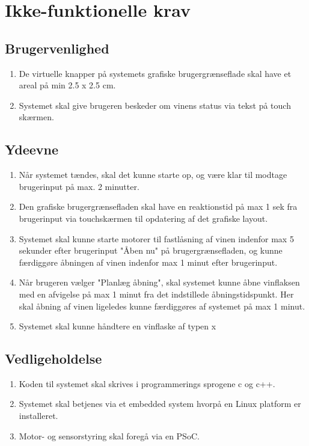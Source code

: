 \section{Ikke-funktionelle krav}

\subsection{Brugervenlighed}

\begin{enumerate}
\item De virtuelle knapper på systemets grafiske brugergrænseflade skal have et areal på min 2.5 x 2.5 cm.
\item Systemet skal give brugeren beskeder om vinens status via tekst på touch skærmen.
\end{enumerate}

\subsection{Ydeevne}
\begin{enumerate}
\item Når systemet tændes, skal det kunne starte op, og være klar til modtage brugerinput på max. 2 minutter.
\item Den grafiske brugergrænsefladen skal have en reaktionstid på max 1 sek fra brugerinput via touchskærmen 
til opdatering af det grafiske layout.
\item Systemet skal kunne starte motorer til fastlåsning af vinen indenfor max 5 sekunder efter brugerinput "Åben nu" på brugergrænsefladen, og kunne færdiggøre åbningen af vinen indenfor max 1 minut efter brugerinput.
\item Når brugeren vælger "Planlæg åbning", skal systemet kunne åbne vinflaksen med en afvigelse på max 1 minut fra det indstillede åbningstidspunkt. Her skal åbning af vinen ligeledes kunne færdiggøres af systemet på max 1 minut.
\item Systemet skal kunne håndtere en vinflaske af typen x
\end{enumerate}

\subsection{Vedligeholdelse}
\begin{enumerate}
\item Koden til systemet skal skrives i programmerings sprogene c og c++.
\item Systemet skal betjenes via et embedded system hvorpå en Linux platform er installeret.
\item Motor- og sensorstyring skal foregå via en PSoC.
\end{enumerate}
